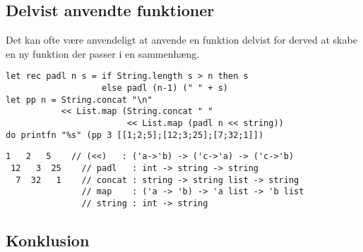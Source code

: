 \documentclass[rgb]{beamer}
\begin{document}
\subsection{Delvist anvendte funktioner}

\begin{frame}[fragile]
\begin{footnotesize}

  Det kan ofte være anvendeligt at anvende en funktion delvist for derved at skabe en ny funktion der passer i en sammenhæng.


\begin{lstlisting}[numbers=none,frame=none,mathescape]
let rec padl n s = if String.length s > n then s
                   else padl (n-1) (" " + s)
let pp n = String.concat "\n"
           << List.map (String.concat " "
                        << List.map (padl n << string))
do printfn "%s" (pp 3 [[1;2;5];[12;3;25];[7;32;1]])
\end{lstlisting}


\begin{lstlisting}[numbers=none,frame=none,mathescape]
  1   2   5    // (<<)   : ('a->'b) -> ('c->'a) -> ('c->'b)
 12   3  25    // padl   : int -> string -> string
  7  32   1    // concat : string -> string list -> string
               // map    : ('a -> 'b) -> 'a list -> 'b list
               // string : int -> string
\end{lstlisting}

\end{footnotesize}
\end{frame}


\subsection*{Konklusion}
\begin{frame}[fragile]

  \vspace{3mm}
  \tableofcontents
\end{frame}
\end{document}
